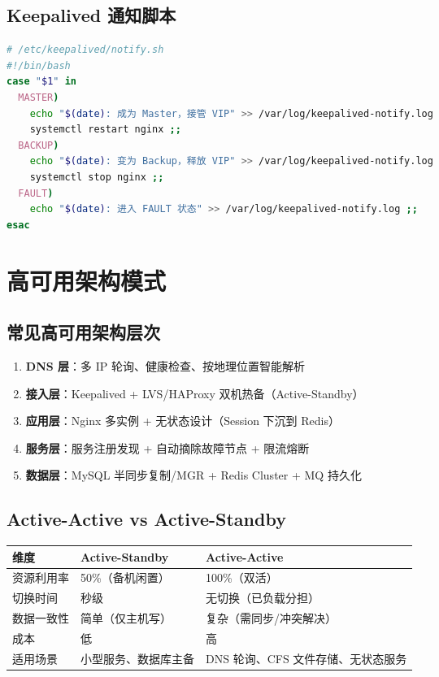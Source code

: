 \documentclass[12pt,UTF8]{ctexbook}
\begin{document}
\subsection*{Keepalived 通知脚本}

\begin{lstlisting}[language=bash]
# /etc/keepalived/notify.sh
#!/bin/bash
case "$1" in
  MASTER)
    echo "$(date): 成为 Master，接管 VIP" >> /var/log/keepalived-notify.log
    systemctl restart nginx ;;
  BACKUP)
    echo "$(date): 变为 Backup，释放 VIP" >> /var/log/keepalived-notify.log
    systemctl stop nginx ;;
  FAULT)
    echo "$(date): 进入 FAULT 状态" >> /var/log/keepalived-notify.log ;;
esac
\end{lstlisting}

\section{高可用架构模式}
\label{sec:ha-patterns}

\subsection*{常见高可用架构层次}

\begin{enumerate}
    \item \textbf{DNS 层}：多 IP 轮询、健康检查、按地理位置智能解析
    \item \textbf{接入层}：Keepalived + LVS/HAProxy 双机热备（Active-Standby）
    \item \textbf{应用层}：Nginx 多实例 + 无状态设计（Session 下沉到 Redis）
    \item \textbf{服务层}：服务注册发现 + 自动摘除故障节点 + 限流熔断
    \item \textbf{数据层}：MySQL 半同步复制/MGR + Redis Cluster + MQ 持久化
\end{enumerate}

\subsection*{Active-Active vs Active-Standby}

\begin{tabular}{|p{2.5cm}|p{4.5cm}|p{4.5cm}|}
\hline
\textbf{维度} & \textbf{Active-Standby} & \textbf{Active-Active} \\
\hline
资源利用率 & 50\%（备机闲置） & 100\%（双活） \\
\hline
切换时间 & 秒级 & 无切换（已负载分担） \\
\hline
数据一致性 & 简单（仅主机写） & 复杂（需同步/冲突解决） \\
\hline
成本 & 低 & 高 \\
\hline
适用场景 & 小型服务、数据库主备 & DNS 轮询、CFS 文件存储、无状态服务 \\
\hline
\end{tabular}
\end{document}

